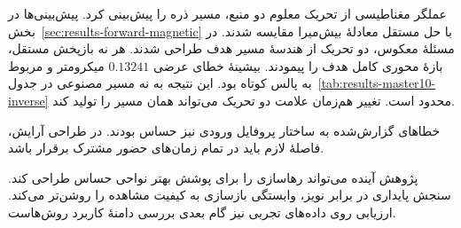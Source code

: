 عملگر مغناطیسی از تحریک معلوم دو منبع، مسیر ذره را پیش‌بینی کرد.
پیش‌بینی‌ها در بخش~\ref{sec:results-forward-magnetic} با حل مستقل معادلهٔ بیش‌میرا مقایسه شدند.
در مسئلهٔ معکوس، دو تحریک از هندسهٔ مسیر هدف طراحی شدند.
هر نه بازپخش مستقل، بازهٔ محوری کامل هدف را پیمودند.
بیشینهٔ خطای عرضی $0.13241$ میکرومتر و مربوط به پالس کوتاه بود.
این نتیجه به نه مسیر مصنوعی در جدول~\ref{tab:results-master10-inverse} محدود است.
تغییر هم‌زمان علامت دو تحریک می‌تواند همان مسیر را تولید کند.


خطاهای گزارش‌شده به ساختار پروفایل ورودی نیز حساس بودند.
در طراحی آرایش، فاصلهٔ لازم باید در تمام زمان‌های حضور مشترک برقرار باشد.

پژوهش آینده می‌تواند رهاسازی را برای پوشش بهتر نواحی حساس طراحی کند.
سنجش پایداری در برابر نویز، وابستگی بازسازی به کیفیت مشاهده را روشن‌تر می‌کند.
ارزیابی روی داده‌های تجربی نیز گام بعدی بررسی دامنهٔ کاربرد روش‌هاست.
